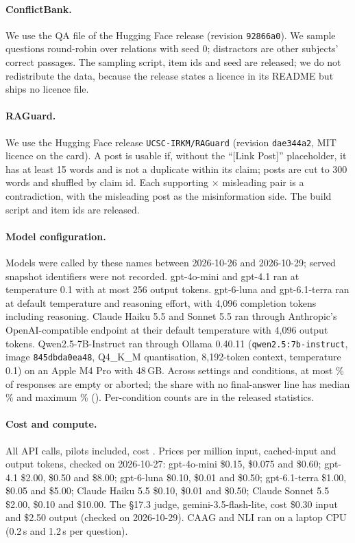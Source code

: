 \paragraph{ConflictBank.} We use the QA file of the Hugging Face release (revision \texttt{92866a0}). We sample questions round-robin over relations with seed 0; distractors are other subjects' correct passages. The
sampling script, item ids and seed are released; we do not redistribute the data, because the release states
a licence in its README but ships no licence file.

\paragraph{RAGuard.} We use the Hugging Face release \texttt{UCSC-IRKM/RAGuard} (revision \texttt{dae344a2}, MIT
licence on the card). A post is usable if, without the ``[Link Post]'' placeholder, it has at least 15 words and is
not a duplicate within its claim; posts are cut to 300 words and shuffled by claim id. Each supporting $\times$ misleading
pair is a contradiction, with the misleading post as the misinformation side. The build script and item ids are
released.

\paragraph{Model configuration.} Models were called by these names between 2026-10-26 and 2026-10-29;
served snapshot identifiers were not recorded. gpt-4o-mini and gpt-4.1 ran at temperature 0.1
with at most 256 output tokens. gpt-6-luna and gpt-6.1-terra ran at default temperature and
reasoning effort, with 4,096 completion tokens including reasoning. Claude Haiku 5.5 and Sonnet 5.5 ran through
Anthropic's OpenAI-compatible endpoint at their default temperature with 4,096 output tokens. Qwen2.5-7B-Instruct ran
through Ollama 0.40.11 (\texttt{qwen2.5:7b-instruct}, image \texttt{845dbda0ea48}, Q4\_K\_M quantisation, 8,192-token
context, temperature 0.1) on an Apple M4 Pro with 48\,GB. Across settings and conditions, at most \truncMaxEmpty\% of
responses are empty or aborted; the share with no final-answer line has median \truncMedNoFinal\% and maximum
\truncMaxNoFinal\% (\truncMaxAt). Per-condition counts are in the released statistics.

\paragraph{Cost and compute.} All API calls, pilots included, cost \totalSpend. Prices per million input, cached-input and output tokens, checked on 2026-10-27: gpt-4o-mini \$0.15, \$0.075 and \$0.60; gpt-4.1 \$2.00, \$0.50 and \$8.00; gpt-6-luna \$0.10, \$0.01 and \$0.50; gpt-6.1-terra \$1.00, \$0.05 and \$5.00; Claude Haiku 5.5 \$0.10, \$0.01 and
\$0.50; Claude Sonnet 5.5 \$2.00, \$0.10 and \$10.00. The \S17.3 judge, gemini-3.5-flash-lite, cost \$0.30 input and \$2.50 output (checked on 2026-10-29). CAAG and NLI ran on a
laptop CPU (0.2\,s and 1.2\,s per question).
